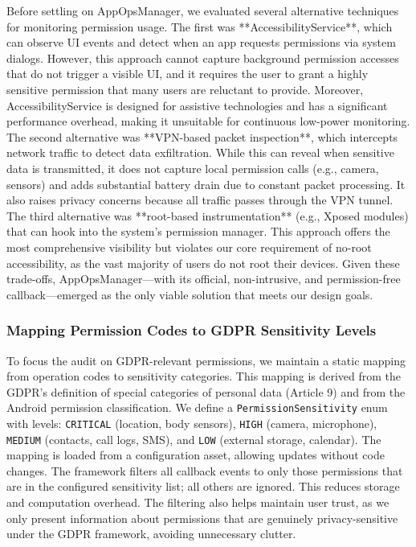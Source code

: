 Before settling on AppOpsManager, we evaluated several alternative techniques for monitoring permission usage. The first was **AccessibilityService**, which can observe UI events and detect when an app requests permissions via system dialogs. However, this approach cannot capture background permission accesses that do not trigger a visible UI, and it requires the user to grant a highly sensitive permission that many users are reluctant to provide. Moreover, AccessibilityService is designed for assistive technologies and has a significant performance overhead, making it unsuitable for continuous low-power monitoring. The second alternative was **VPN-based packet inspection**, which intercepts network traffic to detect data exfiltration. While this can reveal when sensitive data is transmitted, it does not capture local permission calls (e.g., camera, sensors) and adds substantial battery drain due to constant packet processing. It also raises privacy concerns because all traffic passes through the VPN tunnel. The third alternative was **root-based instrumentation** (e.g., Xposed modules) that can hook into the system's permission manager. This approach offers the most comprehensive visibility but violates our core requirement of no-root accessibility, as the vast majority of users do not root their devices. Given these trade-offs, AppOpsManager—with its official, non-intrusive, and permission-free callback—emerged as the only viable solution that meets our design goals.

\subsubsection{Mapping Permission Codes to GDPR Sensitivity Levels}

To focus the audit on GDPR-relevant permissions, we maintain a static mapping from operation codes to sensitivity categories. This mapping is derived from the GDPR's definition of special categories of personal data (Article 9) and from the Android permission classification. We define a \texttt{PermissionSensitivity} enum with levels: \texttt{CRITICAL} (location, body sensors), \texttt{HIGH} (camera, microphone), \texttt{MEDIUM} (contacts, call logs, SMS), and \texttt{LOW} (external storage, calendar). The mapping is loaded from a configuration asset, allowing updates without code changes. The framework filters all callback events to only those permissions that are in the configured sensitivity list; all others are ignored. This reduces storage and computation overhead. The filtering also helps maintain user trust, as we only present information about permissions that are genuinely privacy-sensitive under the GDPR framework, avoiding unnecessary clutter.

